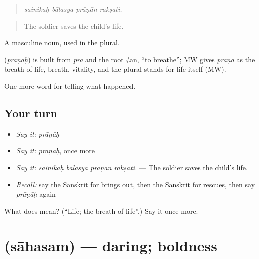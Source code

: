 \begin{quote}
   
\end{quote}

\begin{quote}
\emph{sainikaḥ bālasya prāṇān rakṣati.}
\end{quote}

\begin{quote}
The soldier saves the child's life.
\end{quote}

A masculine noun, used in the plural.

\begin{cousinweb}
\textbf{} (\emph{prāṇāḥ}) is built from \emph{pra} and the root √an, \textquotedblleft{}to breathe\textquotedblright{}; MW gives \emph{prāṇa} as the breath of life, breath, vitality, and the plural stands for life itself (MW).
\end{cousinweb}

\begin{grammarlens}[title={What you've built}]
One more word for telling what happened.
\end{grammarlens}

\subsection*{Your turn}
\begin{itemize}
\raggedright
  \item \emph{Say it:} \emph{prāṇāḥ}
  \item \emph{Say it:} \emph{prāṇāḥ}, once more
  \item \emph{Say it:} \emph{sainikaḥ bālasya prāṇān rakṣati.} — The soldier saves the child's life.
  \item \emph{Recall:} say the Sanskrit for brings out, then the Sanskrit for rescues, then say \emph{prāṇāḥ} again
\end{itemize}

\begin{tcolorbox}[breakable,colback=teal!4,colframe=teal!35!black,title={Before you move on}]
What does  mean? (\textquotedblleft{}Life; the breath of life\textquotedblright{}.) Say it once more.
\end{tcolorbox}
\section[\texorpdfstring{\sk{साहसम्} (sāhasam)}{साहसम् (sāhasam)}]{ (sāhasam) — daring; boldness}

